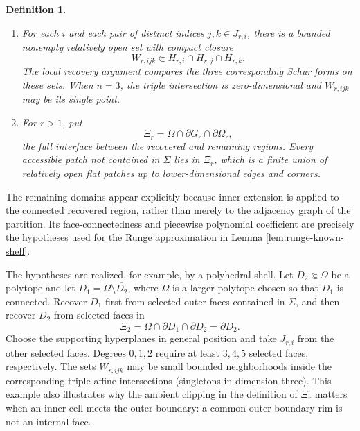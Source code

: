 \documentclass[11pt,oneside]{article}
\newtheorem{definition}[theorem]{Definition}
\begin{document}
\begin{definition}
\begin{enumerate}[label=(\roman*)]
  \(H_{r,1},\ldots,H_{r,M_r}\) of the accessible patches are
  \(N_{\alpha_r}\)-generic.  We fix sets \(J_{r,i}\), \(|J_{r,i}|=N_{\alpha_r}+2\),
  witnessing Definition \ref{def:N-generic}.
  \item For each \(i\) and each pair of distinct indices \(j,k\in J_{r,i}\), there
  is a bounded nonempty relatively open set with compact closure
  \begin{equation}
    W_{r,ijk}\Subset H_{r,i}\cap H_{r,j}\cap H_{r,k}.
  \end{equation}
  The local recovery argument compares the three corresponding Schur forms on
  these sets.  When \(n=3\), the triple intersection is zero-dimensional and
  \(W_{r,ijk}\) may be its single point.
  \item For \(r>1\), put
  \begin{equation}
    \Xi_r=\Omega\cap\partial G_r\cap\partial\Omega_r,
  \end{equation}
  the full interface between the recovered and remaining regions.  Every
  accessible patch not contained in \(\Sigma\) lies in \(\Xi_r\), which is a
  finite union of relatively open flat patches up to lower-dimensional edges
  and corners.
\end{enumerate}
\end{definition}

The remaining domains appear explicitly because inner extension is applied to
the connected recovered region, rather than merely to the adjacency graph of
the partition.  Its face-connectedness and piecewise polynomial coefficient
are precisely the hypotheses used for the Runge approximation in Lemma
\ref{lem:runge-known-shell}.

The hypotheses are realized, for example, by a polyhedral shell.  Let
\(D_2\Subset\Omega\) be a polytope and let
\(D_1=\Omega\setminus\overline{D_2}\), where \(\Omega\) is a larger polytope
chosen so that \(D_1\) is connected.  Recover \(D_1\) first from selected outer
faces contained in \(\Sigma\), and then recover \(D_2\) from selected faces in
\begin{equation}
  \Xi_2=\Omega\cap\partial D_1\cap\partial D_2=\partial D_2.
\end{equation}
Choose the supporting hyperplanes in general position and take
\(J_{r,i}\) from the other selected faces.  Degrees \(0,1,2\) require at least
\(3,4,5\) selected faces, respectively.  The sets \(W_{r,ijk}\) may be small
bounded neighborhoods inside the corresponding triple affine intersections
(singletons in dimension three).  This example also illustrates why the
ambient clipping in the definition of \(\Xi_r\) matters when an inner cell
meets the outer boundary: a common outer-boundary rim is not an internal face.
\end{document}
